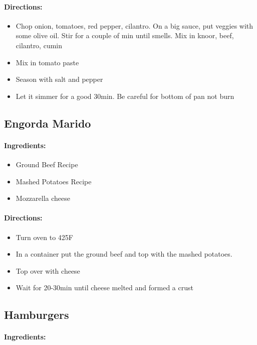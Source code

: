 \documentclass{article}
\begin{document}
\paragraph{Directions:}
\begin{itemize}
	\item Chop onion, tomatoes, red pepper, cilantro. On a big sauce, put veggies with some olive oil. Stir for a couple of min until smells. Mix in knoor, beef, cilantro, cumin 
	\item Mix in tomato paste 
	\item Season with salt and pepper 
	\item Let it simmer for a good 30min. Be careful for bottom of pan not burn
\end{itemize}

\subsection{Engorda Marido}

\paragraph{Ingredients:}

\begin{itemize}
	\item Ground Beef Recipe
	\item Mashed Potatoes Recipe
	\item Mozzarella cheese
\end{itemize}

\paragraph{Directions:}
\begin{itemize}
	\item Turn oven to 425F
	\item In a container put the ground beef and top with the mashed potatoes.
	\item Top over with cheese
	\item Wait for 20-30min until cheese melted and formed a crust
\end{itemize}

\subsection{Hamburgers}

\paragraph{Ingredients:}
\end{document}
